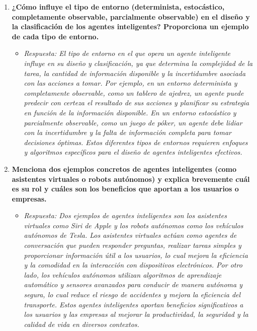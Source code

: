 \documentclass[12pt]{article}
\begin{document}
\begin{enumerate}
    \item \textbf{¿Cómo influye el tipo de entorno (determinista, estocástico, completamente observable, parcialmente observable) en el diseño y la clasificación de los agentes inteligentes? Proporciona un ejemplo de cada tipo de entorno.}
    \begin{itemize}
        \item \textit{Respuesta: El tipo de entorno en el que opera un agente inteligente influye en su diseño y clasificación, ya que determina la complejidad de la tarea, la cantidad de información disponible y la incertidumbre asociada con las acciones a tomar. Por ejemplo, en un entorno determinista y completamente observable, como un tablero de ajedrez, un agente puede predecir con certeza el resultado de sus acciones y planificar su estrategia en función de la información disponible. En un entorno estocástico y parcialmente observable, como un juego de póker, un agente debe lidiar con la incertidumbre y la falta de información completa para tomar decisiones óptimas. Estos diferentes tipos de entornos requieren enfoques y algoritmos específicos para el diseño de agentes inteligentes efectivos.} 
    \end{itemize}

    \item \textbf{Menciona dos ejemplos concretos de agentes inteligentes (como asistentes virtuales o robots autónomos) y explica brevemente cuál es su rol y cuáles son los beneficios que aportan a los usuarios o empresas.}
    \begin{itemize}
        \item \textit{Respuesta: Dos ejemplos de agentes inteligentes son los asistentes virtuales como Siri de Apple y los robots autónomos como los vehículos autónomos de Tesla. Los asistentes virtuales actúan como agentes de conversación que pueden responder preguntas, realizar tareas simples y proporcionar información útil a los usuarios, lo cual mejora la eficiencia y la comodidad en la interacción con dispositivos electrónicos. Por otro lado, los vehículos autónomos utilizan algoritmos de aprendizaje automático y sensores avanzados para conducir de manera autónoma y segura, lo cual reduce el riesgo de accidentes y mejora la eficiencia del transporte. Estos agentes inteligentes aportan beneficios significativos a los usuarios y las empresas al mejorar la productividad, la seguridad y la calidad de vida en diversos contextos.} 
    \end{itemize}
\end{enumerate}
\end{document}

